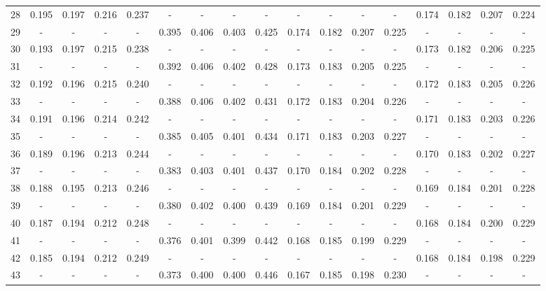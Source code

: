 \documentclass{report}
\begin{document}
\begin{appendices}
\begin{table}
\begin{tabular}{|c|cccc|cccc|cccc|cccc|}
28 & 0.195 & 0.197 & 0.216 & 0.237 &   -   &   -   &   -   &   -   &   -   &   -   &   -   &   -   & 0.174 & 0.182 & 0.207 & 0.224\\
29 &   -   &   -   &   -   &   -   & 0.395 & 0.406 & 0.403 & 0.425 & 0.174 & 0.182 & 0.207 & 0.225 &   -   &   -   &   -   &   -  \\
30 & 0.193 & 0.197 & 0.215 & 0.238 &   -   &   -   &   -   &   -   &   -   &   -   &   -   &   -   & 0.173 & 0.182 & 0.206 & 0.225\\
31 &   -   &   -   &   -   &   -   & 0.392 & 0.406 & 0.402 & 0.428 & 0.173 & 0.183 & 0.205 & 0.225 &   -   &   -   &   -   &   -  \\
32 & 0.192 & 0.196 & 0.215 & 0.240 &   -   &   -   &   -   &   -   &   -   &   -   &   -   &   -   & 0.172 & 0.183 & 0.205 & 0.226\\
33 &   -   &   -   &   -   &   -   & 0.388 & 0.406 & 0.402 & 0.431 & 0.172 & 0.183 & 0.204 & 0.226 &   -   &   -   &   -   &   -  \\
34 & 0.191 & 0.196 & 0.214 & 0.242 &   -   &   -   &   -   &   -   &   -   &   -   &   -   &   -   & 0.171 & 0.183 & 0.203 & 0.226\\
35 &   -   &   -   &   -   &   -   & 0.385 & 0.405 & 0.401 & 0.434 & 0.171 & 0.183 & 0.203 & 0.227 &   -   &   -   &   -   &   -  \\
36 & 0.189 & 0.196 & 0.213 & 0.244 &   -   &   -   &   -   &   -   &   -   &   -   &   -   &   -   & 0.170 & 0.183 & 0.202 & 0.227\\
37 &   -   &   -   &   -   &   -   & 0.383 & 0.403 & 0.401 & 0.437 & 0.170 & 0.184 & 0.202 & 0.228 &   -   &   -   &   -   &   -  \\
38 & 0.188 & 0.195 & 0.213 & 0.246 &   -   &   -   &   -   &   -   &   -   &   -   &   -   &   -   & 0.169 & 0.184 & 0.201 & 0.228\\
39 &   -   &   -   &   -   &   -   & 0.380 & 0.402 & 0.400 & 0.439 & 0.169 & 0.184 & 0.201 & 0.229 &   -   &   -   &   -   &   -  \\
40 & 0.187 & 0.194 & 0.212 & 0.248 &   -   &   -   &   -   &   -   &   -   &   -   &   -   &   -   & 0.168 & 0.184 & 0.200 & 0.229\\
41 &   -   &   -   &   -   &   -   & 0.376 & 0.401 & 0.399 & 0.442 & 0.168 & 0.185 & 0.199 & 0.229 &   -   &   -   &   -   &   -  \\
42 & 0.185 & 0.194 & 0.212 & 0.249 &   -   &   -   &   -   &   -   &   -   &   -   &   -   &   -   & 0.168 & 0.184 & 0.198 & 0.229\\
43 &   -   &   -   &   -   &   -   & 0.373 & 0.400 & 0.400 & 0.446 & 0.167 & 0.185 & 0.198 & 0.230 &   -   &   -   &   -   &   -  \\

\end{tabular}
\end{table}
\end{appendices}
\end{document}
